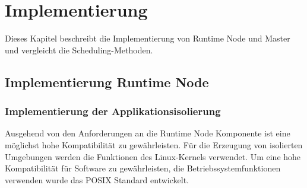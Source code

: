 \chapter{Implementierung}

Dieses Kapitel beschreibt die Implementierung von Runtime Node und Master und vergleicht die Scheduling-Methoden.

\section{Implementierung Runtime Node}


\subsection{Implementierung der Applikationsisolierung}
Ausgehend von den Anforderungen an die Runtime Node Komponente ist eine möglichst hohe Kompatibilität zu gewährleisten. Für die Erzeugung von isolierten Umgebungen werden die Funktionen des Linux-Kernels verwendet. Um eine hohe Kompatibilität für Software zu gewährleisten, die Betriebssystemfunktionen verwenden wurde das \gls{POSIX} Standard entwickelt. 